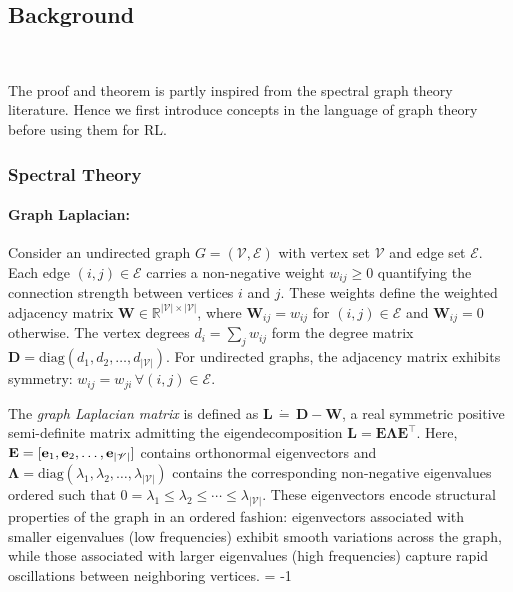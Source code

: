 \documentclass{article}
\theoremstyle{plain}
\theoremstyle{definition}
\theoremstyle{remark}
\begin{document}
\subsection{Background}~\label{sec:app_background}

The proof and theorem is partly inspired from the spectral graph theory literature. Hence we first introduce concepts in the language of graph theory before using them for RL.

\subsubsection{Spectral Theory}
\label{apdx:gft_bg}

\paragraph{Graph Laplacian:} 

Consider an undirected graph $G = (\mathscr{V}, \mathscr{E})$ with vertex set $\mathscr{V}$ and edge set $\mathscr{E}$. Each edge $(i, j) \in \mathscr{E}$ carries a non-negative weight $w_{ij} \ge 0$ quantifying the connection strength between vertices $i$ and $j$. These weights define the weighted adjacency matrix $\mathbf{W} \in \mathbb{R}^{|\mathscr{V}| \times |\mathscr{V}|}$, where $\mathbf{W}_{ij} = w_{ij}$ for $(i, j) \in \mathscr{E}$ and $\mathbf{W}_{ij} = 0$ otherwise. The vertex degrees $d_i = \sum_j w_{ij}$ form the degree matrix $\mathbf{D} = \mathrm{diag}(d_1, d_2, \dots, d_{|\mathscr{V}|})$. For undirected graphs, the adjacency matrix exhibits symmetry: $w_{ij} = w_{ji} \, \forall (i, j) \in \mathscr{E}$.

The \textit{graph Laplacian matrix} is defined as $\mathbf{L} \, \dot{=} \, \mathbf{D} - \mathbf{W}$, a real symmetric positive semi-definite matrix admitting the eigendecomposition $\mathbf{L} = \mathbf{E} \mathbf{\Lambda} \mathbf{E}^\top$. Here, $\mathbf{E} = [\mathbf{e}_1, \mathbf{e}_2, \dots, \mathbf{e}_{|\mathscr{V}|}]$ contains orthonormal eigenvectors and $\mathbf{\Lambda} = \mathrm{diag}(\lambda_1, \lambda_2, \dots, \lambda_{|\mathscr{V}|})$ contains the corresponding non-negative eigenvalues ordered such that $0 = \lambda_1 \le \lambda_2 \le \cdots \le \lambda_{|\mathscr{V}|}$. These eigenvectors encode structural properties of the graph in an ordered fashion: eigenvectors associated with smaller eigenvalues (low frequencies) exhibit smooth variations across the graph, while those associated with larger eigenvalues (high frequencies) capture rapid oscillations between neighboring vertices. \looseness = -1
\end{document}
